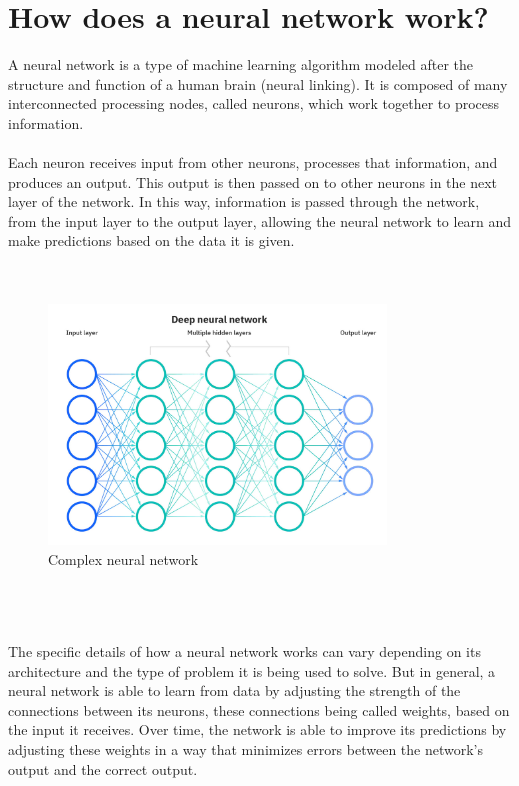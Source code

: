 \section{How does a neural network work?}
A neural network is a type of machine learning algorithm modeled after the structure and function of a human brain (neural linking). It is composed of many interconnected processing nodes, called neurons, which work together to process information. 
\\
\\
Each neuron receives input from other neurons, processes that information, and produces an output. This output is then passed on to other neurons in the next layer of the network. In this way, information is passed through the network, from the input layer to the output layer, allowing the neural network to learn and make predictions based on the data it is given.
\\
\\
\\
\begin{figure}[htb]
    \centering
    \includegraphics[width=0.8\textwidth]{pics/neuralnetwork.jpg}
    \caption{Complex neural network}
\end{figure}
\\
\\
\\
The specific details of how a neural network works can vary depending on its architecture and the type of problem it is being used to solve. But in general, a neural network is able to learn from data by adjusting the strength of the connections between its neurons, these connections being called weights, based on the input it receives. Over time, the network is able to improve its predictions by adjusting these weights in a way that minimizes errors between the network's output and the correct output.

